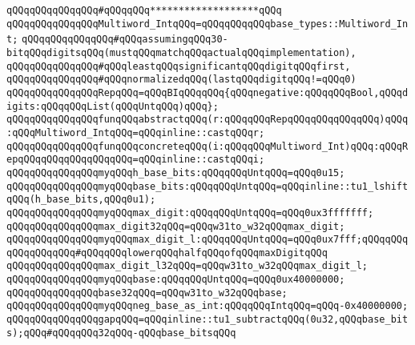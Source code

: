 \verb|qQQqqQQqqQQqqQQq#qQQqqQQq*******************qQQq|\newline
\verb|qQQqqQQqqQQqqQQqMultiword_IntqQQq=qQQqqQQqqQQqbase_types::Multiword_Int;|\newline
\newline
\verb|qQQqqQQqqQQqqQQq#qQQqassumingqQQq30-bitqQQqdigitsqQQq(mustqQQqmatchqQQqactualqQQqimplementation),|\newline
\verb|qQQqqQQqqQQqqQQq#qQQqleastqQQqsignificantqQQqdigitqQQqfirst,|\newline
\verb|qQQqqQQqqQQqqQQq#qQQqnormalizedqQQq(lastqQQqdigitqQQq!=qQQq0)|\newline
\newline
\verb|qQQqqQQqqQQqqQQqRepqQQq=qQQqBIqQQqqQQq{qQQqnegative:qQQqqQQqBool,qQQqdigits:qQQqqQQqList(qQQqUntqQQq)qQQq};|\newline
\newline
\verb|qQQqqQQqqQQqqQQqfunqQQqabstractqQQq(r:qQQqqQQqRepqQQqqQQqqQQqqQQq)qQQq:qQQqMultiword_IntqQQq=qQQqinline::castqQQqr;|\newline
\verb|qQQqqQQqqQQqqQQqfunqQQqconcreteqQQq(i:qQQqqQQqMultiword_Int)qQQq:qQQqRepqQQqqQQqqQQqqQQqqQQq=qQQqinline::castqQQqi;|\newline
\newline
\verb|qQQqqQQqqQQqqQQqmyqQQqh_base_bits:qQQqqQQqUntqQQq=qQQq0u15;|\newline
\verb|qQQqqQQqqQQqqQQqmyqQQqbase_bits:qQQqqQQqUntqQQq=qQQqinline::tu1_lshiftqQQq(h_base_bits,qQQq0u1);|\newline
\verb|qQQqqQQqqQQqqQQqmyqQQqmax_digit:qQQqqQQqUntqQQq=qQQq0ux3fffffff;|\newline
\verb|qQQqqQQqqQQqqQQqmax_digit32qQQq=qQQqw31to_w32qQQqmax_digit;|\newline
\verb|qQQqqQQqqQQqqQQqmyqQQqmax_digit_l:qQQqqQQqUntqQQq=qQQq0ux7fff;qQQqqQQqqQQqqQQqqQQq#qQQqqQQqlowerqQQqhalfqQQqofqQQqmaxDigitqQQq|\newline
\verb|qQQqqQQqqQQqqQQqmax_digit_l32qQQq=qQQqw31to_w32qQQqmax_digit_l;|\newline
\verb|qQQqqQQqqQQqqQQqmyqQQqbase:qQQqqQQqUntqQQq=qQQq0ux40000000;|\newline
\verb|qQQqqQQqqQQqqQQqbase32qQQq=qQQqw31to_w32qQQqbase;|\newline
\verb|qQQqqQQqqQQqqQQqmyqQQqneg_base_as_int:qQQqqQQqIntqQQq=qQQq-0x40000000;|\newline
\newline
\verb|qQQqqQQqqQQqqQQqgapqQQq=qQQqinline::tu1_subtractqQQq(0u32,qQQqbase_bits);qQQq#qQQqqQQq32qQQq-qQQqbase_bitsqQQq|\newline
